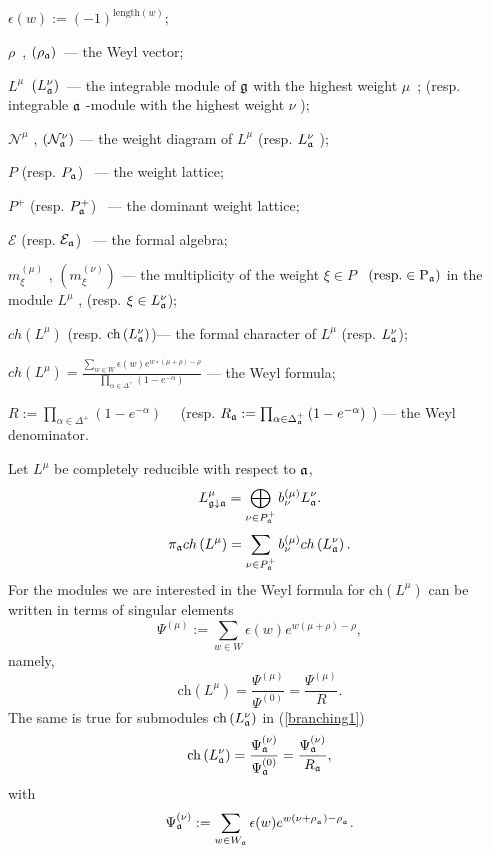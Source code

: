 $\epsilon \left( w\right) :=\left( -1\right) ^{\mathrm{length}(w)}$;

$\rho $\ , $\left( \rho _{\frak{a}}\right) $\ --- the Weyl vector;

$L^{\mu }$\ $\left( L_{\frak{a}}^{\nu }\right) $\ --- the integrable module
of $\frak{g}$ with the highest weight $\mu $\ ; (resp. integrable $\frak{a}$
-module with the highest weight $\nu $ );

$\mathcal{N}^{\mu }$ , $\left( \mathcal{N}_{\frak{a}}^{\nu }\right) $ ---
the weight diagram of $L^{\mu }$ (resp. ${}L_{\frak{a}}^{\nu }$ );

$P$ (resp. $P_{\frak{a}} $) \ --- the weight lattice;

$P^{+}$ (resp. $P_{\frak{a}}^{+} $) \ --- the dominant weight lattice;

$\mathcal{E}$ (resp. $\mathcal{E}_{\frak{a}} $) \ --- the formal algebra;

$m_{\xi }^{\left( \mu \right) }$ , $\left( m_{\xi }^{\left( \nu \right)
}\right) $ --- the multiplicity of the weight $\xi \in P$ \ $\left( \mathrm{{%
resp. }\in P_{\frak{a}}}\right) $ in the module $L^{\mu }$ , (resp. $\xi \in
L_{\frak{a}}^{\nu } $);

$ch\left( L^{\mu }\right) $ (resp. $\mathrm{ch}\left( L_{\frak{a}}^{\nu
}\right) $)--- the formal character of $L^{\mu }$ (resp. $L_{\frak{a}}^{\nu
} $);

$ch\left( L^{\mu }\right)  =\frac{\sum_{w\in W}\epsilon (w)e^{w\circ (\mu
+\rho )-\rho }} {\prod_{\alpha \in \Delta ^{+}} \left( 1-e^{-\alpha }\right)
} $ --- the Weyl formula;

$R:=\prod_{\alpha \in \Delta ^{+}}\left( 1-e^{-\alpha }\right) \quad $
(resp. $R_{\frak{a}}: =\prod_{\alpha \in \Delta_{\frak{a}}^{+}} \left(
1-e^{-\alpha }\right) $ ) --- the Weyl denominator.

Let $L^{\mu }$ be completely reducible with respect to $\frak{a}$,
\[
L_{\frak{g}\downarrow \frak{a}}^{\mu }=\bigoplus\limits_{\nu \in P_{\frak{a}%
}^{+}}b_{\nu }^{\left( \mu \right) }L_{\frak{a}}^{\nu }.
\]
\begin{equation}
\pi _{\frak{a}}ch\left( L^{\mu }\right) =\sum_{\nu \in P_{\frak{a}%
}^{+}}b_{\nu }^{(\mu )}ch\left( L_{\frak{a}}^{\nu }\right) .
\label{branching1}
\end{equation}
For the modules we are interested in the Weyl formula for $\mathrm{ch}\left(
L^{\mu }\right) $ can be written in terms of singular elements \cite
{humphreys1997introduction}
\[
\Psi ^{\left( \mu \right) }:=\sum\limits_{w\in W}\epsilon (w)e^{w(\mu +\rho
)-\rho },
\]
namely,
\begin{equation}
\mathrm{ch}\left( L^{\mu }\right) =\frac{\Psi ^{\left( \mu \right) }}{\Psi
^{\left( 0\right) }}=\frac{\Psi ^{\left( \mu \right) }}{R}.
\label{Weyl-Kac2}
\end{equation}
The same is true for submodules $\mathrm{ch}\left( L_{\frak{a}}^{\nu
}\right) $ in (\ref{branching1})
\[
\mathrm{ch}\left( L_{\frak{a}}^{\nu }\right) =\frac{\Psi _{\frak{a}}^{\left(
\nu \right) }}{\Psi _{\frak{a}}^{\left( 0\right) }}=\frac{\Psi _{\frak{a}%
}^{\left( \nu \right) }}{R_{\frak{a}}},
\]
with
\[
\Psi _{\frak{a}}^{\left( \nu \right) }:=\sum\limits_{w\in W_{\frak{a}%
}}\epsilon (w)e^{w(\nu +\rho _{_{\frak{a}}})-\rho _{_{\frak{a}}}}.
\]

